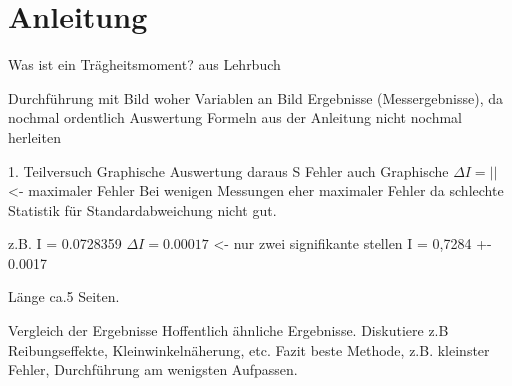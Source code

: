 
\section{Anleitung}
      Was ist ein Trägheitsmoment? aus Lehrbuch

      Durchführung mit Bild woher Variablen an Bild
      Ergebnisse (Messergebnisse), da nochmal ordentlich
      Auswertung
      Formeln aus der Anleitung nicht nochmal herleiten


      1. Teilversuch Graphische Auswertung daraus S
      Fehler auch Graphische
      \( \Delta I = \left|\right| \) <- maximaler Fehler
      Bei wenigen Messungen eher maximaler Fehler da schlechte Statistik für Standardabweichung nicht gut.


      z.B. I = 0.0728359
      \( \Delta I = 0.00017 \) <- nur zwei signifikante stellen
      I = 0,7284 +- 0.0017

      Länge ca.5 Seiten.

    Vergleich der Ergebnisse
    Hoffentlich ähnliche Ergebnisse.
    Diskutiere z.B Reibungseffekte, Kleinwinkelnäherung, etc.
    Fazit beste Methode, z.B. kleinster Fehler, Durchführung am wenigsten Aufpassen.